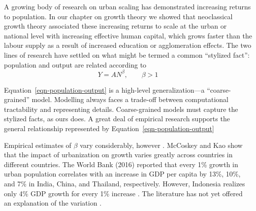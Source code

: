 A growing body of research on urban scaling has demonstrated increasing returns to population. In our chapter on growth theory we showed that neoclassical growth theory associated these increasing returns to scale at the urban or national level with increasing effective human capital, which grows faster than the labour supply as a result of increased education or agglomeration effects. The two lines of research have settled on what might be termed a  common ``stylized  fact'': population and output are related according to 
\begin{equation}
    Y=AN^\beta,\qquad \beta>1 \label{eqn-population-output}
\end{equation}

Equation~\ref{eqn-population-output}  is a high-level generalization---a ``coarse-grained'' model.
Modelling always faces a trade-off between computational tractability and representing details. Coarse-grained models must capture the stylized facts, as ours does. A great deal of empirical research supports the general relationship represented by Equation~\ref{eqn-population-output}

\cite{GET_TerrysDissertation, GET_PaulsBook}


Empirical estimates of $\beta$ vary considerably, however \cite{rosenthalEvidenceNatureSources2004, bettencourtIntroductionUrbanScience2021, loboUrbanScalingProduction2013}. 
McCoskey and Kao \cite{mccoskeyPanelDataInvestigation} show that the impact of urbanization on growth varies greatly across countries in different countries.
The World Bank (2016) reported that every 1\% growth in urban population correlates with an increase in GDP per capita by 13\%, 10\%, and 7\% in India, China, and Thailand, respectively.  However, Indonesia realizes only 4\% GDP growth for every 1\% increase \cite{haryantotriRelationshipUrbanizationEducation2021}. The literature has not yet offered an explanation  of the variation \cite{loboUrbanScalingProduction2013}.

